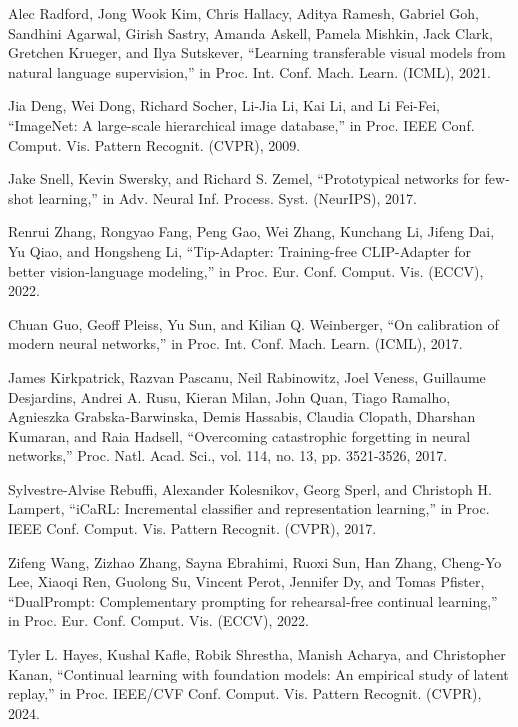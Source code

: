 Alec Radford, Jong Wook Kim, Chris Hallacy, Aditya Ramesh, Gabriel Goh, Sandhini Agarwal, Girish Sastry, Amanda Askell, Pamela Mishkin, Jack Clark, Gretchen Krueger, and Ilya Sutskever, ``Learning transferable visual models from natural language supervision,'' in Proc. Int. Conf. Mach. Learn. (ICML), 2021.

Jia Deng, Wei Dong, Richard Socher, Li-Jia Li, Kai Li, and Li Fei-Fei, ``ImageNet: A large-scale hierarchical image database,'' in Proc. IEEE Conf. Comput. Vis. Pattern Recognit. (CVPR), 2009.

Jake Snell, Kevin Swersky, and Richard S. Zemel, ``Prototypical networks for few-shot learning,'' in Adv. Neural Inf. Process. Syst. (NeurIPS), 2017.

Renrui Zhang, Rongyao Fang, Peng Gao, Wei Zhang, Kunchang Li, Jifeng Dai, Yu Qiao, and Hongsheng Li, ``Tip-Adapter: Training-free CLIP-Adapter for better vision-language modeling,'' in Proc. Eur. Conf. Comput. Vis. (ECCV), 2022.

Chuan Guo, Geoff Pleiss, Yu Sun, and Kilian Q. Weinberger, ``On calibration of modern neural networks,'' in Proc. Int. Conf. Mach. Learn. (ICML), 2017.

James Kirkpatrick, Razvan Pascanu, Neil Rabinowitz, Joel Veness, Guillaume Desjardins, Andrei A. Rusu, Kieran Milan, John Quan, Tiago Ramalho, Agnieszka Grabska-Barwinska, Demis Hassabis, Claudia Clopath, Dharshan Kumaran, and Raia Hadsell, ``Overcoming catastrophic forgetting in neural networks,'' Proc. Natl. Acad. Sci., vol. 114, no. 13, pp. 3521-3526, 2017.

Sylvestre-Alvise Rebuffi, Alexander Kolesnikov, Georg Sperl, and Christoph H. Lampert, ``iCaRL: Incremental classifier and representation learning,'' in Proc. IEEE Conf. Comput. Vis. Pattern Recognit. (CVPR), 2017.

Zifeng Wang, Zizhao Zhang, Sayna Ebrahimi, Ruoxi Sun, Han Zhang, Cheng-Yo Lee, Xiaoqi Ren, Guolong Su, Vincent Perot, Jennifer Dy, and Tomas Pfister, ``DualPrompt: Complementary prompting for rehearsal-free continual learning,'' in Proc. Eur. Conf. Comput. Vis. (ECCV), 2022.

Tyler L. Hayes, Kushal Kafle, Robik Shrestha, Manish Acharya, and Christopher Kanan, ``Continual learning with foundation models: An empirical study of latent replay,'' in Proc. IEEE/CVF Conf. Comput. Vis. Pattern Recognit. (CVPR), 2024.

